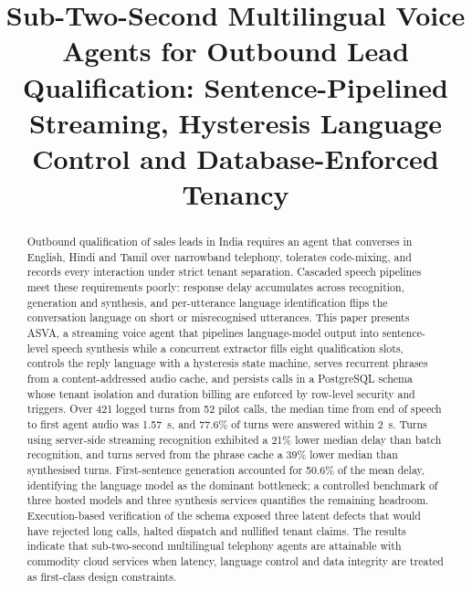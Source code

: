 \documentclass[conference]{IEEEtran}
\begin{document}
\title{Sub-Two-Second Multilingual Voice Agents for Outbound Lead Qualification: Sentence-Pipelined Streaming, Hysteresis Language Control and Database-Enforced Tenancy}

\author{\IEEEauthorblockN{[Author 1], [Author 2], [Author 3]}
}

\maketitle

\begin{abstract}
Outbound qualification of sales leads in India requires an agent that converses in English, Hindi and Tamil over narrowband telephony, tolerates code-mixing, and records every interaction under strict tenant separation. Cascaded speech pipelines meet these requirements poorly: response delay accumulates across recognition, generation and synthesis, and per-utterance language identification flips the conversation language on short or misrecognised utterances. This paper presents ASVA, a streaming voice agent that pipelines language-model output into sentence-level speech synthesis while a concurrent extractor fills eight qualification slots, controls the reply language with a hysteresis state machine, serves recurrent phrases from a content-addressed audio cache, and persists calls in a PostgreSQL schema whose tenant isolation and duration billing are enforced by row-level security and triggers. Over 421 logged turns from 52 pilot calls, the median time from end of speech to first agent audio was 1.57~s, and 77.6\% of turns were answered within 2~s. Turns using server-side streaming recognition exhibited a 21\% lower median delay than batch recognition, and turns served from the phrase cache a 39\% lower median than synthesised turns. First-sentence generation accounted for 50.6\% of the mean delay, identifying the language model as the dominant bottleneck; a controlled benchmark of three hosted models and three synthesis services quantifies the remaining headroom. Execution-based verification of the schema exposed three latent defects that would have rejected long calls, halted dispatch and nullified tenant claims. The results indicate that sub-two-second multilingual telephony agents are attainable with commodity cloud services when latency, language control and data integrity are treated as first-class design constraints.
\end{abstract}
\end{document}
